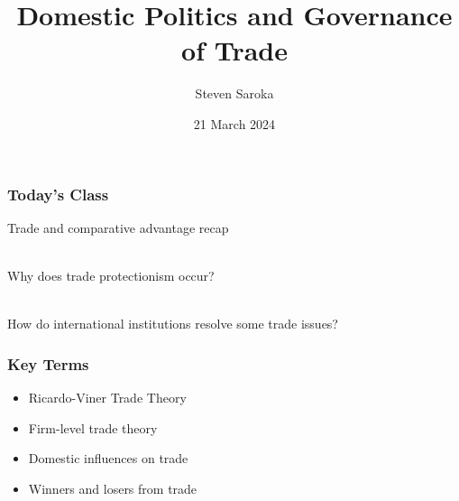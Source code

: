 \documentclass{beamer}
\title[Domestic Politics of Trade]{\LARGE{Domestic Politics and Governance of Trade}}
\author[POLI 150]{Steven Saroka}
\institute{POLI 150}
\date{21 March 2024}
\begin{document}
\begin{frame}
\titlepage %
\end{frame}











\begin{frame} 
	\frametitle{\LARGE{Today's Class}}
	\begin{itemize}
		\Large{
			\item Trade and comparative advantage recap 
			\\~\\ 
			\item Why does trade protectionism occur? 
			\\~\\
			\item How do international institutions resolve some trade issues? 
		}
	\end{itemize}
\end{frame}

\begin{frame} 
	\frametitle{\LARGE{Key Terms}}
	\begin{itemize}
		\item Ricardo-Viner Trade Theory
		\item Firm-level trade theory
		\item Domestic influences on trade
		\item Winners and losers from trade
	\end{itemize}
\end{frame}
\end{document}
